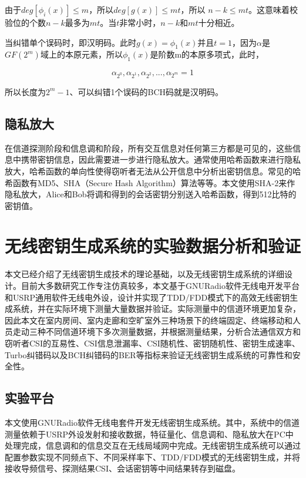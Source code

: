 \documentclass[master]{seuthesis} %
\begin{document}
\begin{Main}
由于$ deg[\phi_i(x)] \leq m $，所以$ deg[g(x)] \leq mt $，所以 $ n -k \leq mt $。这意味着校验位的个数$n - k $最多为$mt$。当$t$非常小时，$n - k $和$mt$十分相近。

当纠错单个误码时，即汉明码。此时$g(x) = \phi_1(x)$并且$t = 1$，因为$\alpha$是$GF(2^m)$域上的本原元素，所以$\phi_1(x)$是阶数m的本原多项式，此时，

\begin{equation}
    \alpha_{2^0}, \alpha_{2^1}, \alpha_{2^2}, ..., \alpha_{2^m} = 1
\end{equation}

所以长度为$2^m - 1$、可以纠错1个误码的BCH码就是汉明码。

\section{隐私放大}

在信道探测阶段和信息调和阶段，所有交互信息对任何第三方都是可见的，这些信息中携带密钥信息，因此需要进一步进行隐私放大。通常使用哈希函数来进行隐私放大，哈希函数的单向性使得窃听者无法从公开信息中分析出密钥信息。常见的哈希函数有MD5、SHA（Secure Hash Algorithm）算法等等。本文使用SHA-2来作隐私放大，Alice和Bob将调和得到的会话密钥分别送入哈希函数，得到512比特的密钥值。

\chapter{无线密钥生成系统的实验数据分析和验证}

本文已经介绍了无线密钥生成技术的理论基础，以及无线密钥生成系统的详细设计。目前大多数研究工作专注仿真较多，本文基于GNURadio软件无线电开发平台和USRP通用软件无线电外设，设计并实现了TDD/FDD模式下的高效无线密钥生成系统，并在实际环境下测量大量数据并验证。实际测量中的信道环境更加复杂，因此本文在室内房间、室内走廊和空旷室外三种场景下的终端固定、终端移动和人员走动三种不同信道环境下多次测量数据，并根据测量结果，分析合法通信双方和窃听者CSI的互易性、CSI信息泄漏率、CSI随机性、密钥随机性、密钥生成速率、Turbo纠错码以及BCH纠错码的BER等指标来验证无线密钥生成系统的可靠性和安全性。

\section{实验平台}

本文使用GNURadio软件无线电套件开发无线密钥生成系统。其中，系统中的信道测量依赖于USRP外设发射和接收数据，特征量化、信息调和、隐私放大在PC中处理完成，信息调和的信息交互在无线局域网中完成。无线密钥生成系统可以通过配置参数实现不同频点下、不同采样率下、TDD/FDD模式的无线密钥生成，并将接收导频信号、探测结果CSI、会话密钥等中间结果转存到磁盘。


\end{Main}
\end{document}
